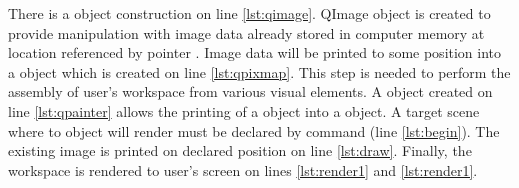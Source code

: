 There is a  object construction on line \ref{lst:qimage}. QImage object is created to provide manipulation with image data already stored in computer memory at location referenced by pointer . Image data will be printed to some position into a  object which is created on line \ref{lst:qpixmap}. This step is needed to perform the assembly of user's workspace from various visual elements. A  object created on line \ref{lst:qpainter} allows the printing of a  object into a  object. A target scene where to  object will render must be declared by  command (line \ref{lst:begin}). The existing image is printed on declared position on line \ref{lst:draw}. Finally, the workspace is rendered to user's screen on lines \ref{lst:render1} and \ref{lst:render1}.



